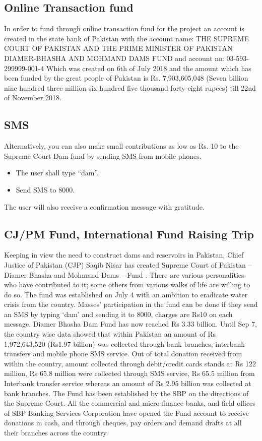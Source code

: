 \documentclass[11pt, journal,letterpaper,compsoc]{IEEEtran}
\begin{document}
\subsection{Online Transaction fund}
In order to fund through online transaction fund for the project an account is created in the state bank of Pakistan with the account name: THE SUPREME COURT OF PAKISTAN AND THE PRIME MINISTER OF PAKISTAN DIAMER-BHASHA AND MOHMAND DAMS FUND and account no: 03-593-299999-001-4 Which was created on 6th of July 2018 and the amount which has been funded by the great people of Pakistan is Rs. 7,903,605,048 (Seven billion nine hundred three million six hundred five thousand forty-eight rupees) till 22nd of November 2018.

\subsection{SMS}
Alternatively, you can also make small contributions as low as Rs. 10 to the Supreme Court Dam fund by sending SMS from mobile phones.
	
	\begin{itemize}
		\item The user shall type “dam”. 
		\item Send SMS to 8000. 
	\end{itemize}

The user will also receive a confirmation message with gratitude.


\subsection{CJ/PM Fund, International Fund Raising Trip}
Keeping in view the need to construct dams and reservoirs in Pakistan, Chief Justice of Pakistan (CJP) Saqib Nisar has created  Supreme Court of Pakistan – Diamer Bhasha and Mohmand Dams – Fund . There are various personalities who have contributed to it; some others from various walks of life are willing to do so. The fund was established on July 4 with an ambition to eradicate water crisis from the country. Masses’ participation in the fund can be done if they send an SMS by typing ‘dam’ and sending it to 8000, charges are Rs10 on each message. Diamer Bhasha Dam Fund has now reached Rs 3.33 billion. Until Sep 7, the country wise data showed that within Pakistan an amount of Rs 1,972,643,520 (Rs1.97 billion) was collected through bank branches, interbank transfers and mobile phone SMS service. Out of total donation received from within the country, amount collected through debit/credit cards stands at Rs 122 million, Rs 65.8 million were collected through SMS service, Rs 65.5 million from Interbank transfer service whereas an amount of Rs 2.95 billion was collected at bank branches. The Fund has been established by the SBP on the directions of the Supreme Court. All the commercial and micro-finance banks, and field offices of SBP Banking Services Corporation have opened the Fund account to receive donations in cash, and through cheques, pay orders and demand drafts at all their branches across the country.
\end{document}
